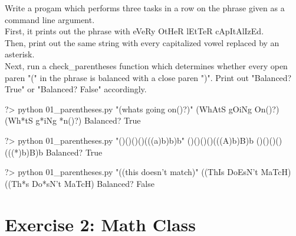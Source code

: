 \documentclass{42-en}
\begin{document}
Write a progam which performs three tasks in a row on the phrase given as a command line argument.\\

First, it prints out the phrase with eVeRy OtHeR lEtTeR cApItAlIzEd.\\

Then, print out the same string with every capitalized vowel replaced by an asterisk.\\

Next, run a check\_parentheses function which determines whether every open paren "(" in the phrase is balanced with a close paren ")". Print out "Balanced? True" or "Balanced? False" accordingly. 


\begin{42console}
	?> python 01_parentheses.py "(whats going on()?)"
	(WhAtS gOiNg On()?)
	(Wh*tS g*iNg *n()?)
	Balanced? True
\end{42console}

\begin{42console}
	?> python 01_parentheses.py "()()()()(((a)b)b)b"
	()()()()(((A)b)B)b
	()()()()(((*)b)B)b
	Balanced? True
\end{42console}

\begin{42console}
	?> python 01_parentheses.py "((this doesn't match)"
	((ThIs DoEsN't MaTcH)
	((Th*s Do*sN't MaTcH)
	Balanced? False
\end{42console}


\nextexercice
\newpage


\chapter{Exercise 2: Math Class}
\makeheaderfiles
\end{document}

